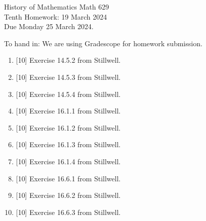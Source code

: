 \documentclass[12pt]{article}
\begin{document}
\LARGE 
\noindent
{\color{Maroon}History of Mathematics \hfill Math 629}\vspace{2pt}\\
\large
Tenth Homework: \hfill 19 March 2024\\
Due Monday 25 March 2024.
\normalsize\vspace{10pt}

To hand in: We are using Gradescope for homework submission.


\begin{enumerate}

\item  {[10]}
     Exercise 14.5.2 from Stillwell.
\item  {[10]}
     Exercise 14.5.3 from Stillwell.
\item  {[10]}
     Exercise 14.5.4 from Stillwell.

\item  {[10]}
     Exercise 16.1.1 from Stillwell.
\item  {[10]}
     Exercise 16.1.2 from Stillwell.
\item  {[10]}
     Exercise 16.1.3 from Stillwell.
\item  {[10]}
     Exercise 16.1.4 from Stillwell.


\item  {[10]}
     Exercise 16.6.1 from Stillwell.
\item  {[10]}
     Exercise 16.6.2 from Stillwell.
\item  {[10]}
     Exercise 16.6.3 from Stillwell.


  \end{enumerate}
\end{document}
